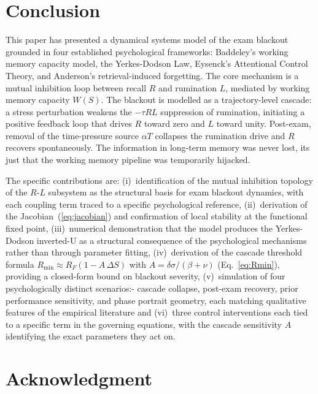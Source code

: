 \section{Conclusion}
\label{sec:conclusion}

This paper has presented a dynamical systems model of the exam
blackout grounded in four established psychological frameworks:
Baddeley's working memory capacity model, the Yerkes-Dodson Law,
Eysenck's Attentional Control Theory, and Anderson's
retrieval-induced forgetting. The core mechanism is a mutual
inhibition loop between recall $R$ and rumination $L$, mediated
by working memory capacity $W(S)$. The blackout is modelled as a
trajectory-level cascade: a stress perturbation weakens the
$-\tau RL$ suppression of rumination, initiating a positive
feedback loop that drives $R$ toward zero and $L$ toward unity.
Post-exam, removal of the time-pressure source $\alpha T$
collapses the rumination drive and $R$ recovers spontaneously.
The information in long-term memory was never lost, its just that the working
memory pipeline was temporarily hijacked.

The specific contributions are: (i)~identification of the mutual
inhibition topology of the $R$-$L$ subsystem as the structural
basis for exam blackout dynamics, with each coupling term traced
to a specific psychological reference, (ii)~derivation of the
Jacobian~(\ref{eq:jacobian}) and confirmation of local stability
at the functional fixed point, (iii)~numerical demonstration that
the model produces the Yerkes-Dodson inverted-U as a structural
consequence of the psychological mechanisms rather than through
parameter fitting, (iv)~derivation of the cascade threshold
formula $R_{\min}\approx R_F(1-A\,\Delta S)$ with
$A=\delta\sigma/(\beta+\nu)$ (Eq.~\ref{eq:Rmin}), providing a
closed-form bound on blackout severity, (v)~simulation of four
psychologically distinct scenarios:- cascade collapse, post-exam
recovery, prior performance sensitivity, and phase portrait
geometry, each matching qualitative features of the empirical
literature and (vi)~three control interventions each tied to a
specific term in the governing equations, with the cascade
sensitivity $A$ identifying the exact parameters they act on.


\section*{Acknowledgment}

